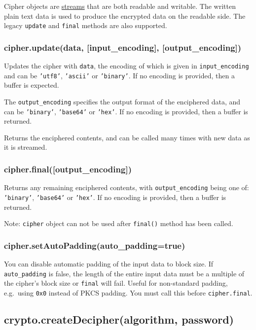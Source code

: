 Cipher objects are \href{stream.html}{streams} that are both readable
and writable. The written plain text data is used to produce the
encrypted data on the readable side. The legacy \texttt{update} and
\texttt{final} methods are also supported.

\subsubsection{cipher.update(data, {[}input\_encoding{]},
{[}output\_encoding{]})}

Updates the cipher with \texttt{data}, the encoding of which is given in
\texttt{input\_encoding} and can be \texttt{'utf8'}, \texttt{'ascii'} or
\texttt{'binary'}. If no encoding is provided, then a buffer is
expected.

The \texttt{output\_encoding} specifies the output format of the
enciphered data, and can be \texttt{'binary'}, \texttt{'base64'} or
\texttt{'hex'}. If no encoding is provided, then a buffer is returned.

Returns the enciphered contents, and can be called many times with new
data as it is streamed.

\subsubsection{cipher.final({[}output\_encoding{]})}

Returns any remaining enciphered contents, with
\texttt{output\_encoding} being one of: \texttt{'binary'},
\texttt{'base64'} or \texttt{'hex'}. If no encoding is provided, then a
buffer is returned.

Note: \texttt{cipher} object can not be used after \texttt{final()}
method has been called.

\subsubsection{cipher.setAutoPadding(auto\_padding=true)}

You can disable automatic padding of the input data to block size. If
\texttt{auto\_padding} is false, the length of the entire input data
must be a multiple of the cipher's block size or \texttt{final} will
fail. Useful for non-standard padding, e.g.~using \texttt{0x0} instead
of PKCS padding. You must call this before \texttt{cipher.final}.

\subsection{crypto.createDecipher(algorithm, password)}


